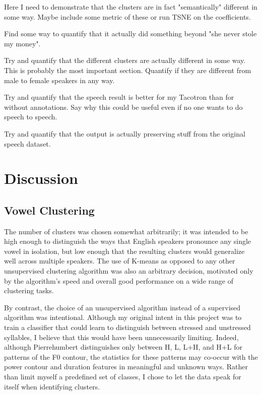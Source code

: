 \documentclass{article}
\begin{document}
Here I need to demonstrate that the clusters are in fact "semantically" different in some way. Maybe include some metric of these or run TSNE on the coefficients.

Find some way to quantify that it actually did something beyond "she never stole my money".

Try and quantify that the different clusters are actually different in some way. This is probably the most important section. Quantify if they are different from male to female speakers in any way.

Try and quantify that the speech result is better for my Tacotron than for without annotations. Say why this could be useful even if no one wants to do speech to speech.

Try and quantify that the output is actually preserving stuff from the original speech dataset.

\section{Discussion}
\label{sec:discussion}

\subsection{Vowel Clustering}
\label{ssec:discussvowels}

The number of clusters was chosen somewhat arbitrarily; it was intended to be high enough to distinguish the ways that English speakers pronounce any single vowel in isolation, but low enough that the resulting clusters would generalize well across multiple speakers.
The use of K-means as opposed to any other unsupervised clustering algorithm was also an arbitrary decision, motivated only by the algorithm's speed and overall good performance on a wide range of clustering tasks.

By contrast, the choice of an unsupervised algorithm instead of a supervised algorithm was intentional.
Although my original intent in this project was to train a classifier that could learn to distinguish between stressed and unstressed syllables, I believe that this would have been unnecessarily limiting.
Indeed, although Pierrehumbert \cite{pierrehumbert1980phonology} distinguishes only between H, L, L+H, and H+L for patterns of the F0 contour, the statistics for these patterns may co-occur with the power contour and duration features in meaningful and unknown ways. Rather than limit myself a predefined set of classes, I chose to let the data speak for itself when identifying clusters.
\end{document}
